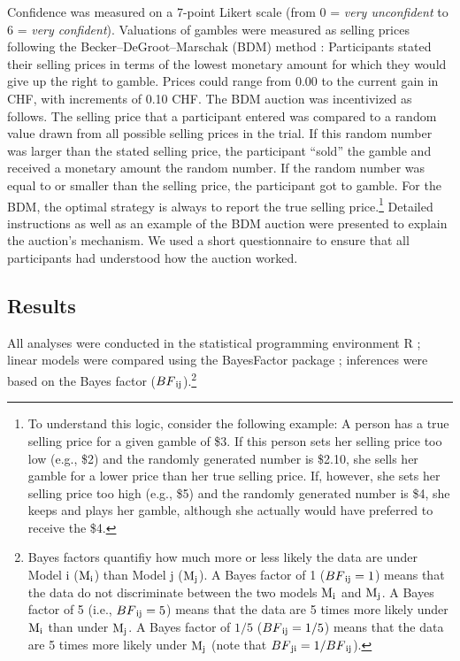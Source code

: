 \documentclass[a4paper, man, natbib, floatsintext]{apa6} %
\begin{document}
Confidence was measured on a 7-point Likert scale (from 0 = \textit{very unconfident} to 6 = \textit{very confident}). Valuations of gambles were measured as selling prices following the Becker--DeGroot--Marschak (BDM) method \citep{Becker1964}: Participants stated their selling prices in terms of the lowest monetary amount for which they would give up the right to gamble. Prices could range from 0.00 to the current gain in CHF, with increments of 0.10 CHF. The BDM auction was incentivized as follows. The selling price that a participant entered was compared to a random value drawn from all possible selling prices in the trial. If this random number was larger than the stated selling price, the participant ``sold'' the gamble and received a monetary amount  the random number. If the random number was equal to or smaller than the selling price, the participant got to gamble. For the BDM, the optimal strategy is always to report the true selling price.\footnote{\label{logic.BDM} 
To understand this logic, consider the following example: A person has a true selling price for a given gamble of \$3. If this person sets her selling price too low (e.g., \$2) and the randomly generated number is \$2.10, she sells her gamble for a lower price than her true selling price. If, however, she sets her selling price too high (e.g., \$5) and the randomly generated number is \$4, she keeps and plays her gamble, although she actually would have preferred to receive the \$4.
} Detailed instructions as well as an example of the BDM auction were presented to explain the auction's mechanism. We used a short questionnaire to ensure that all participants had understood how the auction worked.

\subsection{Results}
All analyses were conducted in the statistical programming environment R \citep{R2019}; linear models were compared using the BayesFactor package \citep{BayesFactor}; inferences were based on the Bayes factor ($BF\textsubscript{ij}$).\footnote{Bayes factors quantifiy how much more or less likely the data are under Model i ($\mathrm{M}\textsubscript{i}$) than Model j ($\mathrm{M}\textsubscript{j}$). A Bayes factor of 1 ($BF\textsubscript{ij} = 1$) means that the data do not discriminate between the two models $\mathrm{M}\textsubscript{i}$ and $\mathrm{M}\textsubscript{j}$. A Bayes factor of 5 (i.e., $BF\textsubscript{ij} = 5$) means that the data are 5 times more likely under $\mathrm{M}\textsubscript{i}$ than under $\mathrm{M}\textsubscript{j}$. A Bayes factor of $1/5$ ($BF\textsubscript{ij} = 1/5$) means that the data are 5 times more likely under $\mathrm{M}\textsubscript{j}$ (note that $BF\textsubscript{ji} = 1/BF\textsubscript{ij}$).} 

\end{document}
